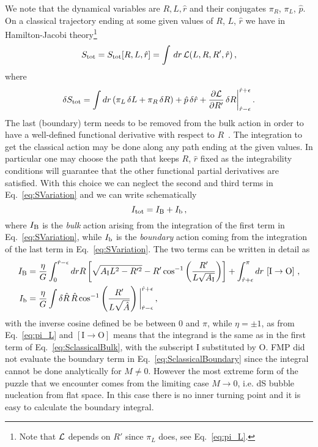 \documentclass[11pt,a4paper]{article}
\begin{document}
We note that the dynamical variables are $R, L, \hat{r}$ and their conjugates $\pi_{R}$, $\pi_{L}$, $\hat{p}$. On a classical trajectory ending at some given values of $R$, $L$, $\hat{r}$ we have in Hamilton-Jacobi theory\footnote{Note that ${\cal L}$ depends on $R'$ since $\pi_{L}$ does, see Eq.~\eqref{eq:pi_L}.}
\begin{equation}
S_{\rm tot} = S_{\rm tot} [R, L, \hat{r}] = \int \, dr \, {\cal L}(L, R, R', \hat{r}) \,,
\end{equation}
where
\begin{equation}
\label{eq:SVariation}
\delta S_{\rm tot} = \int dr \left(\pi_{L} \, \delta L + \pi_{R} \, \delta R \right) +\hat{p} \, \delta\hat{r}+\frac{\partial{\cal L}}{\partial R'}\, \delta R\bigg|_{\hat{r} - \epsilon}^{\hat{r} + \epsilon} \,.
\end{equation}
 The last (boundary) term needs to be removed from the bulk
action in order to have a well-defined functional derivative with respect to $R$~\cite{Fischler:1990pk}. The integration to get the classical action may be done along
any path ending at the given values. In particular one may choose
the path that keeps $R$, $\hat{r}$ fixed as the integrability conditions
will guarantee that the other functional partial derivatives are satisfied. With this choice we can neglect the second and third terms in Eq.~\eqref{eq:SVariation} and we can write schematically
\begin{equation}
\label{eq:Scl}
I_{\rm tot} = I_{{\rm B}} + I_{{\rm b}} \,,
\end{equation}
where $I_{\rm B}$ is the \textit{bulk} action arising from the integration of the first term in Eq.~\eqref{eq:SVariation}, while $I_{\rm b}$ is the \textit{boundary} action coming from the integration of the last term in Eq.~\eqref{eq:SVariation}. The two terms can be written in detail as
\begin{align}
\label{eq:SclassicalBulk}
I_{{\rm B}} & = \frac{\eta}{G}\int_{0}^{\hat{r}-\epsilon}drR\left[ \sqrt{A_{{\rm I}}L^{2}-R'^{2}}-R'\cos^{-1}\left(\frac{R'}{L\sqrt{A_{{\rm I}}}}\right)\right] + \int_{\hat{r}+\epsilon}^{\pi}dr \,\left[{\rm I}\rightarrow{\rm O}\right] \,, \\
\label{eq:SclassicalBoundary}
I_{{\rm b}} & = \frac{\eta}{G}\int\delta\hat{R} \, \hat{R}\cos^{-1}\left(\frac{R'}{L\sqrt{\hat{A}}}\right)\bigg|_{\hat{r}-\epsilon}^{\hat{r}+\epsilon} \,,
\end{align}
with the inverse cosine defined be be between $0$ and $\pi$, while $\eta = \pm 1$, as from Eq.~\eqref{eq:pi_L} and $[\text{I} \rightarrow \text{O}]$ means that the integrand is the same as in the first term of Eq.~\eqref{eq:SclassicalBulk}, with the subscript I substituted by O. FMP did not evaluate the boundary term in Eq.~\eqref{eq:SclassicalBoundary} since the integral
cannot be done analytically for $M \ne 0$. However the most extreme
form of the puzzle that we encounter comes from the limiting case
$M\rightarrow0$, i.e. dS bubble nucleation from flat space.
In this case there is no inner turning point and it is easy to calculate the boundary integral. 
\end{document}
